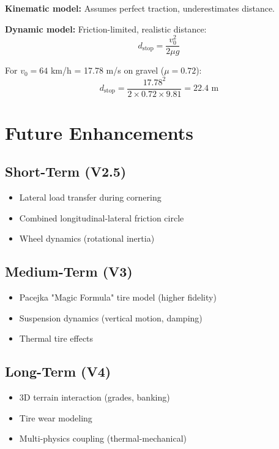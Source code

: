 \documentclass[11pt,a4paper]{article}
\begin{document}
\textbf{Kinematic model:} Assumes perfect traction, underestimates distance.

\textbf{Dynamic model:} Friction-limited, realistic distance:
\begin{equation}
d_{\text{stop}} = \frac{v_0^2}{2 \mu g}
\end{equation}

For $v_0 = 64$ km/h = 17.78 m/s on gravel ($\mu = 0.72$):
\begin{equation}
d_{\text{stop}} = \frac{17.78^2}{2 \times 0.72 \times 9.81} = 22.4 \text{ m}
\end{equation}

\section{Future Enhancements}

\subsection{Short-Term (V2.5)}
\begin{itemize}
    \item Lateral load transfer during cornering
    \item Combined longitudinal-lateral friction circle
    \item Wheel dynamics (rotational inertia)
\end{itemize}

\subsection{Medium-Term (V3)}
\begin{itemize}
    \item Pacejka "Magic Formula" tire model (higher fidelity)
    \item Suspension dynamics (vertical motion, damping)
    \item Thermal tire effects
\end{itemize}

\subsection{Long-Term (V4)}
\begin{itemize}
    \item 3D terrain interaction (grades, banking)
    \item Tire wear modeling
    \item Multi-physics coupling (thermal-mechanical)
\end{itemize}
\end{document}
